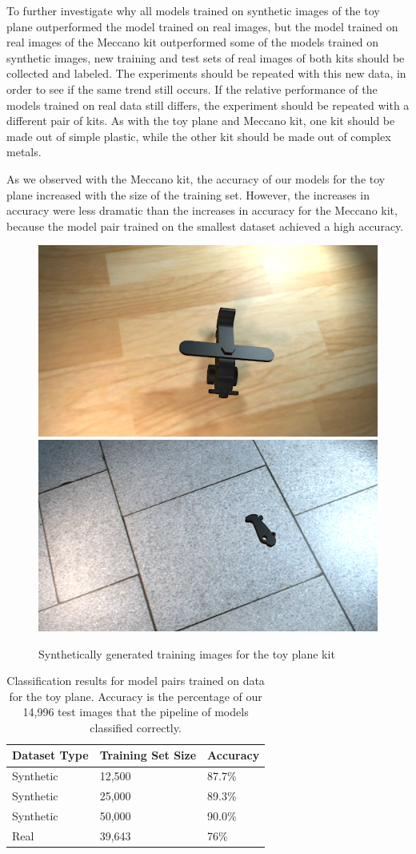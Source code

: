 To further investigate why all models trained on synthetic images of the toy
plane outperformed the model trained on real images, but the model trained on
real images of the Meccano kit outperformed some of the models trained on
synthetic images, new training and test sets of real images of both kits should
be collected and labeled.
The experiments should be repeated with this new data, in order to see if the
same trend still occurs.
If the relative performance of the models trained on real data still differs,
the experiment should be repeated with a different pair of kits.
As with the toy plane and Meccano kit, one kit should be made out of simple
plastic, while the other kit should be made out of complex metals.

As we observed with the Meccano kit, the accuracy of our models for the toy
plane increased with the size of the training set.
However, the increases in accuracy were less dramatic than the increases in
accuracy for the Meccano kit, because the model pair trained on the smallest
dataset achieved a high accuracy.

\begin{figure}
  \includegraphics[width=0.5\columnwidth]{figures/synthetic/plane_train1.png}
  \includegraphics[width=0.5\columnwidth]{figures/synthetic/plane_train2.png}
  \caption{
    Synthetically generated training images for the toy plane kit
  }\label{fig:plane_train}
\end{figure}

\begin{table}
\begin{tabular}{|l||l|l|}
\hline
  Dataset Type & Training Set Size & Accuracy\\
  \hline
  \hline
  Synthetic & 12,500 & 87.7\%\\
  Synthetic & 25,000 & 89.3\%\\
  Synthetic & 50,000 & 90.0\%\\
  \hline
  Real & 39,643 & 76\%\\
\hline
\end{tabular}
\caption[
Classification results for model pairs trained on data for the toy plane
]{
    Classification results for model pairs trained on data for the toy plane.
    Accuracy is the percentage of our 14,996 test images that the pipeline of
    models classified correctly.
  }\label{tab:plane_accuracy}
\end{table}

